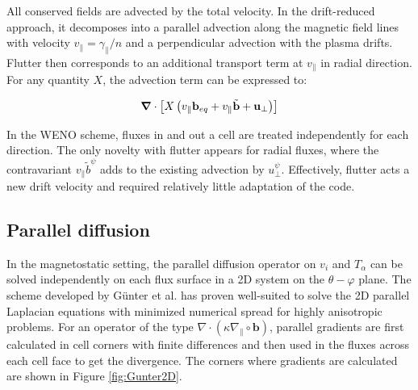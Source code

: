 All conserved fields are advected by the total velocity. In the drift-reduced approach, it decomposes into a parallel advection along the magnetic field lines with velocity $v_\parallel=\gamma_\parallel / n$ and a perpendicular advection with the plasma drifts. Flutter then corresponds to an additional transport term at $v_\parallel$ in radial direction. For any quantity $X$, the advection term can be expressed to: 

\begin{equation}
	\grad\cdot \left[X\left(v_\parallel\mathbf{b}_{eq}+v_\parallel\tilde{\mathbf{b}} + \mathbf{u}_\perp\right)\right]
\end{equation}

In  the WENO scheme, fluxes in and out a cell are treated independently for each direction. The only novelty with flutter appears for radial fluxes, where the contravariant $v_\parallel \tilde{b}^\psi$ adds to the existing advection by $u_\perp^\psi$. Effectively, flutter acts a new drift velocity and required relatively little adaptation of the code.

\subsection{Parallel diffusion}
\label{ssec:impl_3DGunter}

In the magnetostatic setting, the parallel diffusion operator on $v_i$ and $T_\alpha$ can be solved independently on each flux surface in a 2D system on the $\theta - \varphi$ plane. The scheme developed by Günter et al. \cite{gunter2005} has proven well-suited to solve the 2D parallel Laplacian equations with minimized numerical spread for highly anisotropic problems. For an operator of the type $\nabla \cdot (\kappa \nabla_\parallel \circ \mathbf{b} )$, parallel gradients are first calculated in cell corners with finite differences and then used in the fluxes across each cell face to get the divergence. The corners where gradients are calculated are shown in Figure \ref{fig:Gunter2D}.  \\

